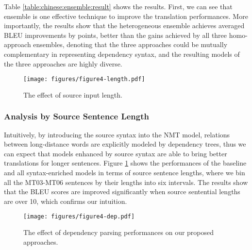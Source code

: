 \documentclass[11pt,a4paper]{article}
\begin{document}
\begin{CJK}{UTF8}{gbsn}
Table \ref{table:chinese:ensemble:result} shows the results.
First, we can see that ensemble is one effective technique to improve the translation performances.
More importantly, the results show that the heterogeneous ensemble achieves averaged BLEU improvements by  points,
better than the gains achieved by all three homo-approach ensembles,
denoting that the three approaches could be mutually complementary in representing dependency syntax,
and the resulting models of the three approaches are highly diverse.



\begin{figure}[tb]
	\centerline{\texttt{[image: figures/figure4-length.pdf]}}
	\caption{The effect of source input length. }\label{analyze-source-length}
\end{figure}

\subsubsection{Analysis by Source Sentence Length}
Intuitively, by introducing the source syntax into the NMT model,
relations between long-distance words are explicitly modeled by dependency trees,
thus we can expect that models enhanced by source syntax are able to bring better translations for longer sentences.
Figure \ref{analyze-source-length} shows the performances of the baseline and all syntax-enriched models in terms of source sentence lengths,
where we bin all the MT03-MT06 sentences by their lengths into six intervals.
The results show that the BLEU scores are improved significantly when source sentential lengths are over 10,
which confirms our intuition.



\begin{figure}[tb]
	\centerline{\texttt{[image: figures/figure4-dep.pdf]}}
	\caption{The effect of dependency parsing performances on our proposed approaches. }\label{analyze-parsing-performance}
\end{figure}


\end{CJK}
\end{document}
